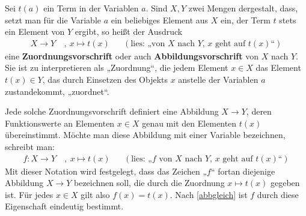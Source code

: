 \begin{nota} \label{def:zuordnung}  
    Sei $t(a)$ ein Term in der Variablen $a$. Sind $X,Y$ zwei Mengen dergestalt, dass, setzt man für die Variable $a$ ein beliebiges Element aus $X$ ein, der Term $t$ stets ein Element von $Y$ ergibt, so heißt der Ausdruck
    \begin{align*}
        X \to Y \ &,\ x\mapsto t(x) && (\text{lies: „von $X$ nach $Y$, $x$ geht auf $t(x)$“})
    \end{align*}
    eine \textbf{Zuordnungsvorschrift} oder auch \textbf{Abbildungsvorschrift} von $X$ nach $Y$. Sie ist zu interpretieren als „Zuordnung“, die jedem Element $x\in X$ das Element $t(x)\in Y$, das durch Einsetzen des Objekts $x$ anstelle der Variablen $a$ zustandekommt, „zuordnet“.
    
    Jede solche Zuordnungsvorschrift definiert eine Abbildung $X\to Y$, deren Funktionswerte an Elementen $x\in X$ genau mit den Elementen $t(x)$ übereinstimmt. Möchte man diese Abbildung mit einer Variable bezeichnen, schreibt man:
    \begin{align*}
        f : X\to Y \ & ,\ x\mapsto t(x) && (\text{lies: „$f$ von $X$ nach $Y$, $x$ geht auf $t(x)$“})
    \end{align*}
    Mit dieser Notation wird festgelegt, dass das Zeichen „$f$“ fortan diejenige Abbildung $X\to Y$ bezeichnen soll, die durch die Zuordnung $x\mapsto t(x)$ gegeben ist. Für jedes $x\in X$ gilt also $f(x)=t(x)$. Nach \cref{abbgleich} ist $f$ durch diese Eigenschaft eindeutig bestimmt.
\end{nota}


